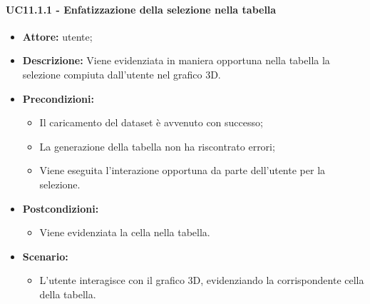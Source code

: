 \paragraph{UC11.1.1 - Enfatizzazione della selezione nella tabella}
\begin{itemize}    
    \item \textbf{Attore:} utente;
    \item \textbf{Descrizione:} Viene evidenziata in maniera opportuna nella tabella la selezione compiuta dall'utente nel grafico 3D.
    \item \textbf{Precondizioni:}    
        \begin{itemize}
            \item Il caricamento del dataset è avvenuto con successo;
            \item La generazione della tabella non ha riscontrato errori;
            \item Viene eseguita l'interazione opportuna da parte dell'utente per la selezione.
        \end{itemize}    
    \item \textbf{Postcondizioni:}
        \begin{itemize}
            \item Viene evidenziata la cella nella tabella.
        \end{itemize}    
    \item \textbf{Scenario:} 
        \begin{itemize}
            \item L'utente interagisce con il grafico 3D, evidenziando la corrispondente cella della tabella.
        \end{itemize}
\end{itemize}

\pagebreak

